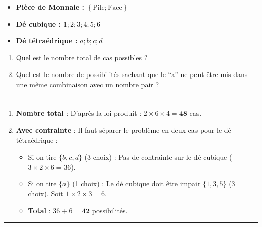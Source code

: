 \documentclass[12pt,a4paper]{article}
\begin{document}
\vspace{1em}

\begin{itemize}
    \item \textbf{Pièce de Monnaie :} $\left\{ \text{Pile} ; \text{Face} \right\}$
    \item \textbf{Dé cubique :} $1 ; 2 ; 3 ; 4 ; 5 ; 6$
    \item \textbf{Dé tétraédrique :} $a ; b ; c ; d$
\end{itemize}

\vspace{1em}

\begin{enumerate}
    \item Quel est le nombre total de cas possibles ?
    \item Quel est le nombre de possibilités sachant que le ``a'' ne peut être mis dans une même combinaison avec un nombre pair ?
\end{enumerate}

\vspace{2em}
\hrule
\vspace{1em}

\subsubsection*{\underline{\color{red}{Solution (Indications)}}}

\begin{enumerate}
    \item \textbf{Nombre total} : 
    D'après la loi produit : $2 \times 6 \times 4 = \mathbf{48}$ cas.

    \item \textbf{Avec contrainte} : 
    Il faut séparer le problème en deux cas pour le dé tétraédrique :
    \begin{itemize}
        \item Si on tire $\{b, c, d\}$ (3 choix) : Pas de contrainte sur le dé cubique ($3 \times 2 \times 6 = 36$).
        \item Si on tire $\{a\}$ (1 choix) : Le dé cubique doit être impair $\{1, 3, 5\}$ (3 choix). Soit $1 \times 2 \times 3 = 6$.
        \item \textbf{Total} : $36 + 6 = \mathbf{42}$ possibilités.
    \end{itemize}
\end{enumerate}

\vspace{2em}
\hrule
\vspace{1em}
\end{document}
